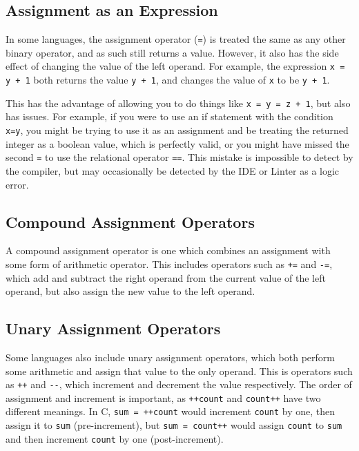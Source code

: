 \subsection*{Assignment as an Expression}

In some languages, the assignment operator (\verb`=`) is treated the same as any other binary operator, and as such
 still returns a value. However, it also has the side effect of changing the value of the left operand. For example, the
 expression \verb`x = y + 1` both returns the value \verb`y + 1`, and changes the value of \verb`x` to be \verb`y + 1`.

This has the advantage of allowing you to do things like \verb`x = y = z + 1`, but also has issues. For example, if you
 were to use an if statement with the condition \verb`x=y`, you might be trying to use it as an assignment and be treating
 the returned integer as a boolean value, which is perfectly valid, or you might have missed the second \verb`=` to use
 the relational operator \verb`==`. This mistake is impossible to detect by the compiler, but may occasionally be detected
 by the IDE or Linter as a logic error.

\subsection*{Compound Assignment Operators}

A compound assignment operator is one which combines an assignment with some form of arithmetic operator. This includes
 operators such as \verb`+=` and \verb`-=`, which add and subtract the right operand from the current value of the left
 operand, but also assign the new value to the left operand.

\subsection*{Unary Assignment Operators}

Some languages also include unary assignment operators, which both perform some arithmetic and assign that value to the
 only operand. This is operators such as \verb`++` and \verb`--`, which increment and decrement the value respectively.
 The order of assignment and increment is important, as \verb`++count` and \verb`count++` have two different meanings.
 In C, \verb`sum = ++count` would increment \verb`count` by one, then assign it to \verb`sum` (pre-increment), but
 \verb`sum = count++` would assign \verb`count` to \verb`sum` and then increment \verb`count` by one (post-increment).

